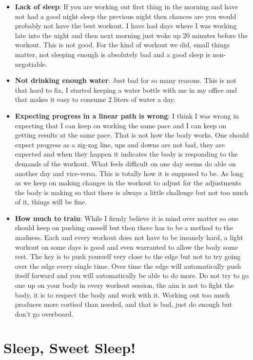 \documentclass[
  oneside]{book}
\begin{document}
\begin{itemize}
\item
  \textbf{Lack of sleep}: If you are working out first thing in the morning and have not had a good night sleep the previous night then chances are you would probably not have the best workout. I have had days where I was working late into the night and then next morning just woke up 20 minutes before the workout. This is not good. For the kind of workout we did, small things matter, not sleeping enough is absolutely bad and a good sleep is non-negotiable.
\item
  \textbf{Not drinking enough water}: Just bad for so many reasons. This is not that hard to fix, I started keeping a water bottle with me in my office and that makes it easy to consume 2 liters of water a day.
\item
  \textbf{Expecting progress in a linear path is wrong}: I think I was wrong in expecting that I can keep on working the same pace and I can keep on getting results at the same pace. That is not how the body works. One should expect progress as a zig-zag line, ups and downs are not bad, they are expected and when they happen it indicates the body is responding to the demands of the workout. What feels difficult on one day seems do able on another day and vice-versa. This is totally how it is supposed to be. As long as we keep on making changes in the workout to adjust for the adjustments the body is making so that there is always a little challenge but not too much of it, things will be fine.
\item
  \textbf{How much to train}: While I firmly believe it is mind over matter so one should keep on pushing oneself but then there has to be a method to the madness. Each and every workout does not have to be insanely hard, a light workout on some days is good and even warranted to allow the body some rest. The key is to push yourself very close to the edge but not to try going over the edge every single time. Over time the edge will automatically push itself forward and you will automatically be able to do more. Do not try to go one up on your body in every workout session, the aim is not to fight the body, it is to respect the body and work with it. Working out too much produces more cortisol than needed, and that is bad, just do enough but don't go overboard.
\end{itemize}

\hypertarget{sleep-sweet-sleep}{%
\section{Sleep, Sweet Sleep!}\label{sleep-sweet-sleep}}
\end{document}
